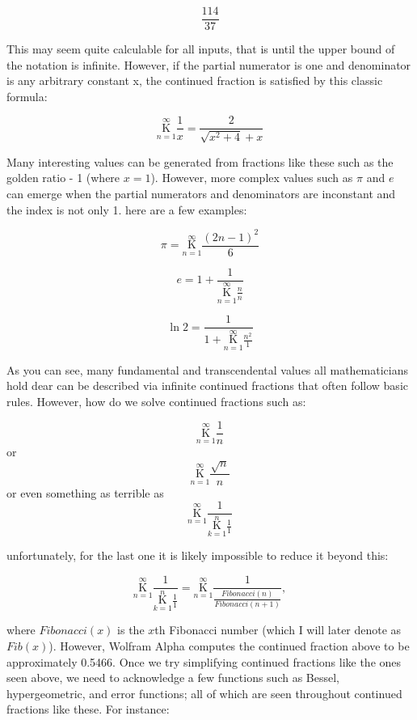 \documentclass{article}
\begin{document}
$$\frac{114}{37}$$

This may seem quite calculable for all inputs, that is until the upper bound of the notation is infinite. However, if the partial numerator is one and denominator is any arbitrary constant x, the continued fraction is satisfied by this classic formula:

$$ \underset{n=1}{\overset{\infty}{ \mathrm K}} \frac{1}{x} = \frac{2}{\sqrt{x^2 +4} + x}$$

Many interesting values can be generated from fractions like these such as the golden ratio - 1 (where $x = 1$). However, more complex values such as $\pi$ and $e$ can emerge when the partial numerators and denominators are inconstant and the index is not only 1. here are a few examples:

$$ \pi = \underset{n=1}{\overset{\infty}{ \mathrm K}} \frac{(2n-1)^2}{6} $$

$$ e = 1 + \frac{1}{\underset{n=1}{\overset{\infty}{ \mathrm K}} \frac{n}{n}} $$

$$ \ln{2} = \frac{1}{1+\underset{n=1}{\overset{\infty}{ \mathrm K}} \frac{n^2}{1}} $$

As you can see, many fundamental and transcendental values all mathematicians hold dear can be described via infinite continued fractions that often follow basic rules. However, how do we solve continued fractions such as:

$$ \underset{n=1}{\overset{\infty}{ \mathrm K}} \frac{1}{n} $$
or
$$ \underset{n=1}{\overset{\infty}{ \mathrm K}} \frac{\sqrt{n}}{n} $$
or even something as terrible as
$$ \underset{n=1}{\overset{\infty}{ \mathrm K}} \frac{1}{ \underset{k=1}{\overset{n}{ \mathrm K}} \frac{1}{1} } $$


unfortunately, for the last one it is likely impossible to reduce it beyond this:

$$ \underset{n=1}{\overset{\infty}{ \mathrm K}} \frac{1}{ \underset{k=1}{\overset{n}{ \mathrm K}} \frac{1}{1} } = \underset{n=1}{\overset{\infty}{ \mathrm K}} \frac{1}{\frac{Fibonacci(n)}{Fibonacci(n+1)}},$$  

where $Fibonacci(x)$ is the $x$th Fibonacci number (which I will later denote as $Fib(x)$). However, Wolfram Alpha computes the continued fraction above to be approximately 0.5466. Once we try simplifying continued fractions like the ones seen above, we need to acknowledge a few functions such as Bessel, hypergeometric, and error functions; all of which are seen throughout continued fractions like these. For instance:
\end{document}
